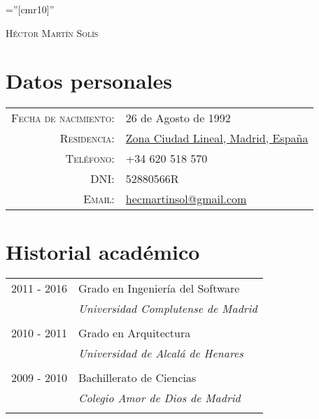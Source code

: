 \documentclass[a4paper,10pt]{article}
\begin{document}
\pagestyle{empty} %

\font\fb=''[cmr10]'' %

\par{\centering
		{\Huge \textsc{Héctor Martín Solís}
	}\bigskip\par}

\section{Datos personales}

\begin{tabular}{rl}
    \textsc{Fecha de nacimiento:} & 26 de Agosto de 1992 \\
    \textsc{Residencia:}   & \href{https://goo.gl/maps/dTcRVe9CrJS2}{Zona Ciudad Lineal, Madrid, España} \\
    \textsc{Teléfono:}     & +34 620 518 570\\
    \textsc{DNI:}     & 52880566R\\
    \textsc{Email:}     & \href{mailto:hecmartinsol@gmail.com}{hecmartinsol@gmail.com}
\end{tabular}

\section{Historial académico}
\begin{tabular}{rl}	
	\textsc{2011 - 2016}& Grado en Ingeniería del Software\\&
	\small\emph{Universidad Complutense de Madrid}\\&\\

	\textsc{2010 - 2011}& Grado en Arquitectura\\&
	\small\emph{Universidad de Alcalá de Henares}\\&\\

	\textsc{2009 - 2010}& Bachillerato de Ciencias\\&
	\small\emph{Colegio Amor de Dios de Madrid}\\&\\
\end{tabular}


\end{document}
